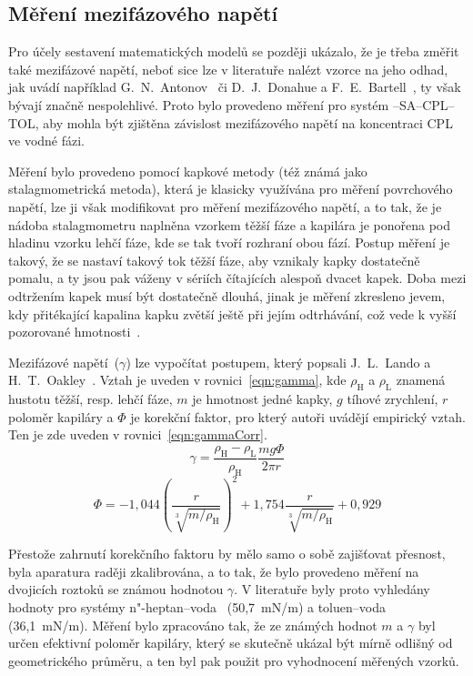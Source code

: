 \subsection{Měření mezifázového napětí} \label{gamma}
Pro účely sestavení matematických modelů se později ukázalo, že je třeba změřit také mezifázové napětí, neboť sice lze v literatuře nalézt vzorce na jeho odhad, jak uvádí například G.~N.~Antonov~\cite{Antonov1907} či D.~J.~Donahue a F.~E.~Bartell~\cite{Donahue1952}, ty však bývají značně nespolehlivé.
Proto bylo provedeno měření pro systém --SA--CPL--TOL, aby mohla být zjištěna závislost mezifázového napětí na koncentraci CPL ve vodné fázi.

Měření bylo provedeno pomocí kapkové metody (též známá jako stalagmometrická metoda), která je klasicky využívána pro měření povrchového napětí, lze ji však modifikovat pro měření mezifázového napětí, a to tak, že je nádoba stalagmometru naplněna vzorkem těžší fáze a kapilára je ponořena pod hladinu vzorku lehčí fáze, kde se tak tvoří rozhraní obou fází.
Postup měření je takový, že se nastaví takový tok těžší fáze, aby vznikaly kapky dostatečně pomalu, a ty jsou pak váženy v sériích čítajících alespoň dvacet kapek.
Doba mezi odtržením kapek musí být dostatečně dlouhá, jinak je měření zkresleno jevem, kdy přitékající kapalina kapku zvětší ještě při jejím odtrhávání, což vede k vyšší pozorované hmotnosti~\cite{Harkins1919}.

Mezifázové napětí~($\gamma$) lze vypočítat postupem, který popsali J.~L.~Lando a H.~T.~Oakley~\cite{Lando1967}. Vztah je uveden v rovnici~\ref{eqn:gamma}, kde $\rho_\mathrm{H}$ a $\rho_\mathrm{L}$ znamená hustotu těžší, resp. lehčí fáze, $m$ je hmotnost jedné kapky, $g$ tíhové zrychlení, $r$ poloměr kapiláry a $\Phi$ je korekční faktor, pro který autoři uvádějí empirický vztah. Ten je zde uveden v rovnici~\ref{eqn:gammaCorr}.
\begin{equation}
\label{eqn:gamma}
	\gamma = \frac{\rho_\mathrm{H} - \rho_\mathrm{L}}{\rho_\mathrm{H}} \frac{m g \Phi}{2 \pi r}
\end{equation}
\begin{equation}
\label{eqn:gammaCorr}
	\Phi = -1,044 \left(\frac{r}{\sqrt[3]{m / \rho_\mathrm{H}}}\right)^2 + 1,754 \frac{r}{\sqrt[3]{m / \rho_\mathrm{H}}} + 0,929
\end{equation}

Přestože zahrnutí korekčního faktoru by mělo samo o sobě zajišťovat přesnost, byla aparatura raději zkalibrována, a to tak, že bylo provedeno měření na dvojicích roztoků se známou hodnotou $\gamma$.
V literatuře byly proto vyhledány hodnoty pro systémy n"-heptan--voda~\cite{Johnson1966} (50,7~mN/m) a toluen--voda~\cite{InternationalCriticalTables} (36,1~mN/m).
Měření bylo zpracováno tak, že ze známých hodnot $m$ a $\gamma$ byl určen efektivní poloměr kapiláry, který se skutečně ukázal být mírně odlišný od geometrického průměru, a ten byl pak použit pro vyhodnocení měřených vzorků.

